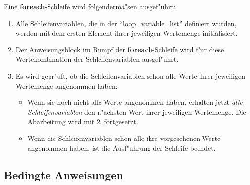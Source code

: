 Eine {\bf foreach}-Schleife wird folgenderma"sen ausgef"uhrt:
\begin{enumerate}
  \item Alle Schleifenvariablen, die in der ``loop\_variable\_list'' definiert wurden, werden 
	mit dem ersten Element ihrer jeweiligen Wertemenge initialisiert. 
  \item Der Anweisungsblock im Rumpf der {\bf
foreach}-Schleife wird f"ur diese Wertekombination der 
	Schleifenvariablen ausgef"uhrt.
  \item Es wird gepr"uft, ob die  Schleifenvariablen schon alle Werte ihrer jeweiligen
	Wertemenge angenommen haben:
	\begin{itemize}
	  \item Wenn sie noch nicht alle Werte angenommen haben, erhalten jetzt {\it alle
		Schleifenvariablen\/} den n"achsten Wert ihrer jeweiligen Wertemenge. Die
		Abarbeitung wird mit 2. fortgesetzt.
	  \item Wenn die Schleifenvariablen schon alle ihre vorgesehenen Werte angenommen haben, ist
		die Ausf"uhrung der Schleife beendet.
	\end{itemize}
\end{enumerate}


\subsection{Bedingte Anweisungen}
\label{condstatement}

\begin{center}
\end{center}

